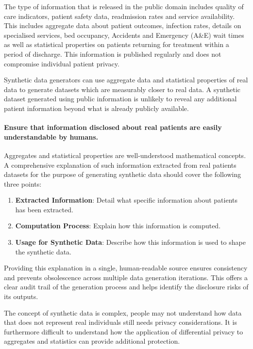 \documentclass[11pt]{article}
\begin{document}
The type of information that is released in the public domain includes quality of care indicators, patient safety data, readmission rates and service availability. This includes aggregate data about patient outcomes, infection rates, details on specialised services, bed occupancy, Accidents and Emergency (A\&E) wait times as well as statistical properties on patients returning for treatment within a period of discharge. This information is published regularly and does not compromise individual patient privacy.  

Synthetic data generators can use aggregate data and statistical properties of real data to generate datasets which are measurably closer to real data. A synthetic dataset generated using public information is unlikely to reveal any additional patient information beyond what is already publicly available.

\paragraph{Ensure that information disclosed about real patients are easily understandable by humans.}

Aggregates and statistical properties are well-understood mathematical concepts. A comprehensive explanation of such information extracted from real patients datasets for the purpose of generating synthetic data should cover the following three points:

\begin{enumerate}
    \item \textbf{Extracted Information}: Detail what specific information about patients has been extracted.
    \item \textbf{Computation Process}: Explain how this information is computed.
    \item \textbf{Usage for Synthetic Data}: Describe how this information is used to shape the synthetic data.
\end{enumerate}

Providing this explanation in a single, human-readable source ensures consistency and prevents obsolescence across multiple data generation iterations. This offers a clear audit trail of the generation process and helps identify the disclosure risks of its outputs.

The concept of synthetic data is complex, people may not understand how data that does not represent real individuals still needs privacy considerations. It is furthermore difficult to understand how the application of differential privacy to aggregates and statistics can provide additional protection. 
\end{document}
